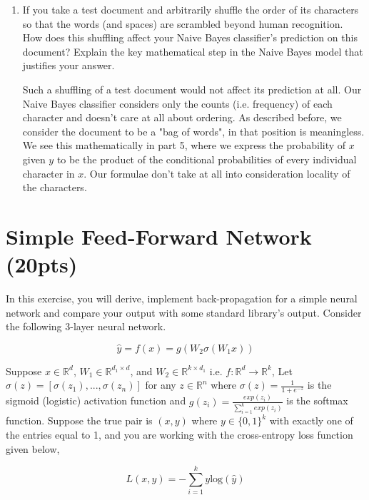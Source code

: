 \documentclass[a4paper]{article}
\theoremstyle{definition}
\newenvironment{soln}{
    \leavevmode\color{blue}\ignorespaces
}{}
\begin{document}
\begin{enumerate}
\item If you take a test document and arbitrarily shuffle the order of its characters so that the words (and spaces) are scrambled beyond human recognition.  How does this shuffling affect your Naive Bayes classifier's prediction on this document?  Explain the key mathematical step in the Naive Bayes model that justifies your answer.

\begin{soln}
	Such a shuffling of a test document would not affect its prediction at all. Our Naive Bayes classifier considers only the counts (i.e. frequency) of each character and doesn't care at all about ordering. As described before, we consider the document to be a "bag of words", in that position is meaningless. We see this mathematically in part 5, where we express the probability of $x$ given $y$ to be the product of the conditional probabilities of every individual character in $x$. Our formulae don't take at all into consideration locality of the characters.
\end{soln}

\end{enumerate}

\section{Simple Feed-Forward Network (20pts)}
In this exercise, you will derive, implement back-propagation for a simple neural network and compare your output with some standard library’s output. Consider the following 3-layer neural network.

\[
\hat{y} = f(x) = g(W_2\sigma(W_1x))
\]

Suppose $x \in \mathbb{R}^d$, $W_1 \in \mathbb{R}^{d_1 \times d}$, and $W_2 \in \mathbb{R}^{k \times d_1}$ i.e. $f: \mathbb{R}^d \rightarrow \mathbb{R}^k$, Let $\sigma(z) = [\sigma(z_1), ..., \sigma(z_n)]$ for any $z \in \mathbb{R}^n$ where $\sigma(z) = \frac{1}{1 + e^{-z}}$ is the sigmoid (logistic) activation function and $g(z_i) = \frac{exp(z_i)}{\sum_{i=1}^k exp(z_i)}$ is the softmax function. Suppose the true pair is $(x, y)$ where $y \in \{0, 1\}^k$ with exactly one of the entries equal to 1, and you are working with the cross-entropy loss function given below,

\[
L(x, y) = -\sum_{i=1}^k y \text{log}(\hat{y})
\]
\end{document}
